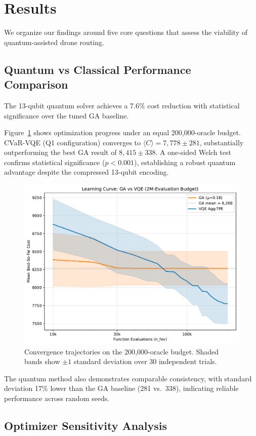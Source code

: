 \section{Results}
\label{sec:results}

We organize our findings around five core questions that assess the viability 
of quantum-assisted drone routing.

\subsection{Quantum vs Classical Performance Comparison}

The 13-qubit quantum solver achieves a 7.6\% cost reduction with statistical 
significance over the tuned GA baseline.

Figure~\ref{fig:learning_curves} shows optimization progress under an equal
200{,}000-oracle budget. CVaR-VQE (Q1 configuration) converges to 
$\langle C\rangle=7{,}778\pm281$, substantially outperforming the best GA result 
of $8{,}415\pm338$. A one-sided Welch test confirms statistical significance 
($p<0.001$), establishing a robust quantum advantage despite the compressed 
13-qubit encoding.

\begin{figure}[h]
  \centering
  \includegraphics[width=.7\linewidth]{fig/learning_curves_comparison.pdf}
  \caption{Convergence trajectories on the 200{,}000-oracle budget. 
           Shaded bands show $\pm1$ standard deviation over 30 independent trials.}
  \label{fig:learning_curves}
\end{figure}

The quantum method also demonstrates comparable consistency, with standard deviation 
17\% lower than the GA baseline (281 vs.\ 338), indicating reliable 
performance across random seeds.

\subsection{Optimizer Sensitivity Analysis}

